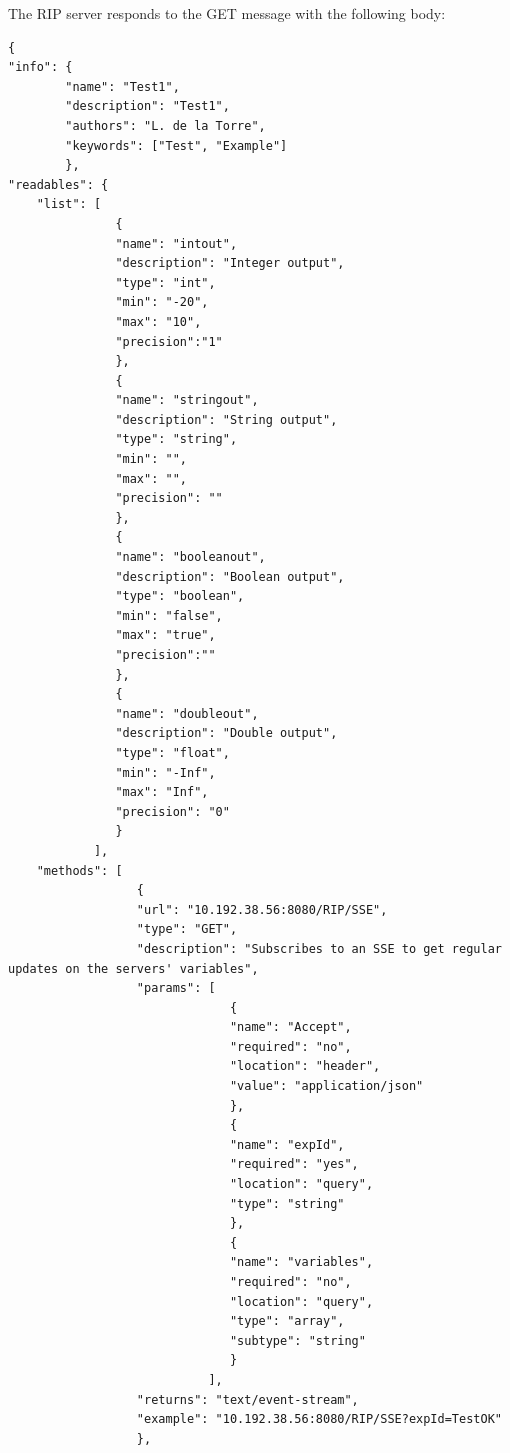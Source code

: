 The RIP server responds to the GET message with the following body:

\begin{lstlisting}
{
"info": {
        "name": "Test1",
        "description": "Test1",
        "authors": "L. de la Torre",
        "keywords": ["Test", "Example"]
        },
"readables": {
    "list": [
               {
               "name": "intout",
               "description": "Integer output",
               "type": "int",
               "min": "-20",
               "max": "10",
               "precision":"1"
               },
               {
               "name": "stringout",
               "description": "String output",
               "type": "string",
               "min": "",
               "max": "",
               "precision": ""
               },
               {
               "name": "booleanout",
               "description": "Boolean output",
               "type": "boolean",
               "min": "false",
               "max": "true",
               "precision":""
               },
               {
               "name": "doubleout",
               "description": "Double output",
               "type": "float",
               "min": "-Inf",
               "max": "Inf",
               "precision": "0"
               }
            ],
    "methods": [  
                  {
                  "url": "10.192.38.56:8080/RIP/SSE",
                  "type": "GET",
                  "description": "Subscribes to an SSE to get regular updates on the servers' variables",
                  "params": [
                               {
                               "name": "Accept",
                               "required": "no",
                               "location": "header",
                               "value": "application/json"
                               },
                               {
                               "name": "expId",
                               "required": "yes",
                               "location": "query",
                               "type": "string"
                               },
                               {
                               "name": "variables",
                               "required": "no",
                               "location": "query",
                               "type": "array",
                               "subtype": "string"
                               }
                            ],
                  "returns": "text/event-stream",
                  "example": "10.192.38.56:8080/RIP/SSE?expId=TestOK"
                  },

\end{lstlisting}
